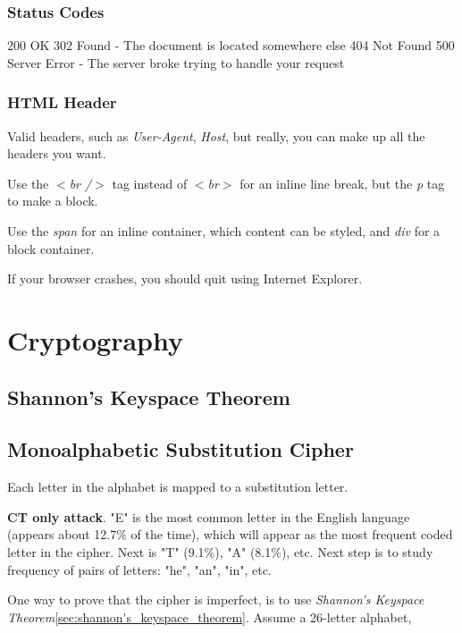 \documentclass[12pt]{article}
\begin{document}
\subsubsection*{Status Codes}
200 OK
302 Found - The document is located somewhere else
404 Not Found
500 Server Error - The server broke trying to handle your request

\subsubsection*{HTML Header}
Valid headers, such as \emph{User-Agent}, \emph{Host}, but really, you can make up all the headers you want.

Use the \emph{$<$br /$>$} tag instead of \emph{$<$br$>$} for an inline line break, but the \emph{p} tag to make a block.

Use the \emph{span} for an inline container, which content can be styled, and \emph{div} for a block container.

If your browser crashes, you should quit using Internet Explorer.

\section*{Cryptography}

\subsection*{Shannon's Keyspace Theorem}
\label{sec:shannon's_keyspace_theorem}

\subsection*{Monoalphabetic Substitution Cipher}

Each letter in the alphabet is mapped to a substitution letter.

\textbf{CT only attack}. "E" is the most common letter in the English language (appears about 12.7\% of the time), which will appear as the most frequent coded letter in the cipher. Next is "T" (9.1\%), "A" (8.1\%), etc. Next step is to study frequency of pairs of letters: "he", "an", "in", etc.

One way to prove that the cipher is imperfect, is to use \emph{Shannon's Keyspace Theorem}\ref{sec:shannon's_keyspace_theorem}. Assume a 26-letter alphabet,
\end{document}
